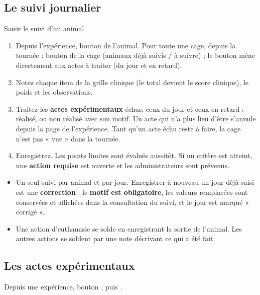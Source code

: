 \documentclass[11pt,a4paper]{article}
\begin{document}
\subsection{Le suivi journalier}
\begin{procedure}{Saisir le suivi d'un animal}
\begin{enumerate}
  \item Depuis l'expérience, bouton  de l'animal. Pour
    toute une cage, depuis la tournée : bouton  de la cage (animaux déjà suivis / à suivre) ; le bouton
     mène directement aux actes à traiter (du jour et en
    retard).
  \item Notez chaque item de la grille clinique (le total devient le score
    clinique), le poids et les observations.
  \item Traitez les \textbf{actes expérimentaux} échus, ceux du jour et
    ceux en retard : réalisé, ou non réalisé avec son motif. Un acte qui
    n'a plus lieu d'être s'annule depuis la page  de
    l'expérience. Tant qu'un acte échu reste à faire, la cage n'est pas
    « vue » dans la tournée.
  \item Enregistrez. Les points limites sont évalués aussitôt. Si un critère
    est atteint, une \textbf{action requise} est ouverte et les
    administrateurs sont prévenus.
\end{enumerate}
\end{procedure}

\begin{trace}
\begin{itemize}
  \item Un seul suivi par animal et par jour. Enregistrer à nouveau un jour
    déjà saisi est une \textbf{correction} : le \textbf{motif est
    obligatoire}, les valeurs remplacées sont conservées et affichées dans la
    consultation du suivi, et le jour est marqué « corrigé ».
  \item Une action d'euthanasie se solde en enregistrant la sortie de
    l'animal. Les autres actions se soldent par une note décrivant ce qui a
    été fait.
\end{itemize}
\end{trace}

\subsection{Les actes expérimentaux}
Depuis une expérience, bouton , puis .
\end{document}
